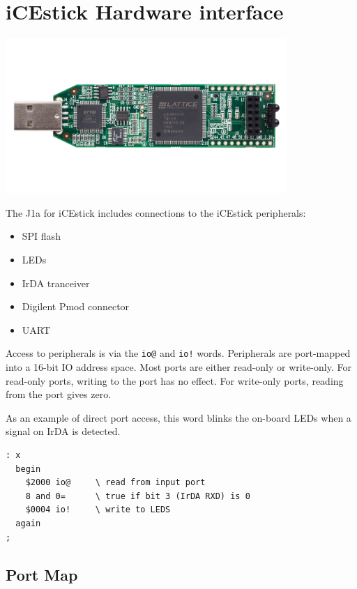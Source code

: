 \documentclass[10pt]{book}
\newcommand{\digilentpmod}{Digilent Pmod\texttrademark{}}
\newcommand{\mach}[1]{\texttt{#1}}
\begin{document}
\chapter{iCEstick Hardware interface}

\begin{center}
\includegraphics[width=0.8\textwidth]{icestick-reva-front-2400.png}
\end{center}

The J1a for iCEstick includes connections to the iCEstick peripherals:
\begin{itemize}
\item SPI flash 
\item LEDs 
\item IrDA tranceiver 
\item \digilentpmod{} connector 
\item UART 
\end{itemize}

Access to peripherals is via the
\mach{io@} and \mach{io!} words.
Peripherals are port-mapped into a 16-bit IO address space.
Most ports are either read-only or write-only.
For read-only ports, writing to the port has no effect.
For write-only ports, reading from the port gives zero.

As an example of direct port access, this word
blinks the on-board LEDs when a signal on IrDA is detected. 

\begin{framed}
\begin{Verbatim}
: x
  begin
    $2000 io@     \ read from input port
    8 and 0=      \ true if bit 3 (IrDA RXD) is 0
    $0004 io!     \ write to LEDS
  again
;
\end{Verbatim}
\end{framed}

\newpage
\section{Port Map}
\end{document}
